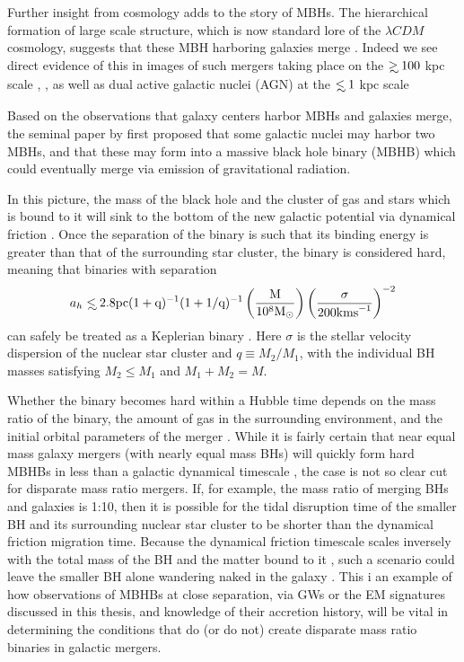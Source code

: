 Further insight from cosmology adds to the story of MBHs. The hierarchical
formation of large scale structure, which is now standard lore of the $\lambda
CDM$ cosmology, suggests that these MBH harboring galaxies merge \citep{HK2002}.
Indeed we see direct evidence of this in images of such mergers taking place
on the $\gsim 100$ kpc scale \citep{Comerford:2013}, \citep[see also][and
references therein]{Dotti:2012:rev}, as well as dual active galactic nuclei
(AGN) at the $\lsim 1$ kpc scale \citep{Komossa:2003, Fabbiano:2011,Rodriguez:2006, BurkeSpolaor:2011, ColpiDotti:2011:rev, Gitti:2013, Woo:subKpcBin:2014,
AndradeSantos:2016}


Based on the observations that galaxy centers harbor MBHs and galaxies merge,
the seminal paper by \cite{Begel:Blan:Rees:1980} first proposed that some
galactic nuclei may harbor two MBHs, and that these may form into a massive
black hole binary (MBHB) which could eventually merge via emission of
gravitational radiation.

In this picture, the mass of the black hole and the cluster of gas and stars
which is bound to it will sink to the bottom of the new galactic potential via
dynamical friction \citep{Begel:Blan:Rees:1980, Chandrasekhar:1943}. Once the
separation of the binary is such that its binding energy is
greater than that of the surrounding star cluster, the binary is considered
hard, meaning that binaries with separation
\begin{equation}
a_h \lsim 2.8 \rm{pc} (1+q)^{-1} (1+1/q)^{-1}  \left( \frac{M}{10^8 \Msun} \right)  
\left( \frac{\sigma}{200 \rm{km s}^{-1}} \right)^{-2}
\end{equation}
can safely be treated as a Keplerian binary
\citep[\emph{e.g.}][]{MerrittMilos:2005:LRR}. Here $\sigma$ is the stellar
velocity dispersion of the nuclear star cluster and $q\equiv M_2/M_1$, with
the individual BH masses satisfying $M_2 \leq M_1$ and $M_1+M_2=M$.

Whether the binary becomes hard within a Hubble time depends on the mass ratio
of the binary, the amount of gas in the surrounding environment, and the
initial orbital parameters of the merger \citep{Mayer:2013:MBHBGasRev}. While
it is fairly certain that near equal mass galaxy mergers (with nearly equal
mass BHs) will quickly form hard MBHBs in less than a galactic dynamical
timescale \citep{Mayer+2007, Chapon+2013}, the case is not so clear cut for
disparate mass ratio mergers. If, for example, the mass ratio of merging BHs
and galaxies is 1:10, then it is possible for the tidal disruption time of the
smaller BH and its surrounding nuclear star cluster to be shorter than the
dynamical friction migration time. Because the dynamical friction timescale
scales inversely with the total mass of the BH and the matter bound to it
\citep{Chandrasekhar:1943, ColpiDotti:2011:rev}, such a scenario could leave
the smaller BH alone wandering naked in the galaxy \citep{Callegari:2011,
Mayer:2013:MBHBGasRev}. This i an example of how observations of MBHBs at
close separation, via GWs or the EM signatures discussed in this thesis, and
knowledge of their accretion history, will be vital in determining the
conditions that do (or do not) create disparate mass ratio binaries in
galactic mergers.

